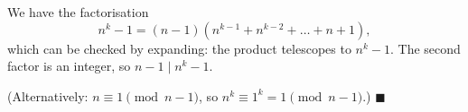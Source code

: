 We have the factorisation
\[
n^k-1=(n-1)\left(n^{k-1}+n^{k-2}+\dots+n+1\right),
\]
which can be checked by expanding: the product telescopes to $n^k-1$. The second factor is an integer, so $n-1\mid n^k-1$.

(Alternatively: $n\equiv1\pmod{n-1}$, so $n^k\equiv1^k=1\pmod{n-1}$.) $\blacksquare$
